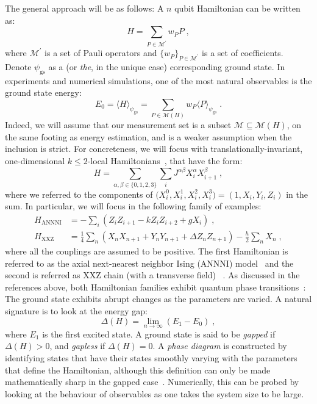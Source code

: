 \documentclass[10pt,aps,pra,twocolumn,floatfix,nofootinbib,superscriptaddress,longbibliography]{revtex4-2}
\newcommand{\1}{\mathbbm{1}}
\begin{document}
The general  approach will be as follows: A $n$ qubit Hamiltonian can be written as:
\begin{equation}
    H = \sum_{P \in \mathcal M^\prime}w_P P\;,
\end{equation}
where $\mathcal M^\prime$ is a set of Pauli operators and $\{w_P\}_{P \in \mathcal M^\prime}$ is a set of coefficients. Denote $\psi_\mathrm{gs}$ as a (or \emph{the}, in the unique case) corresponding ground state. In experiments and numerical simulations, one of the most natural observables is the ground state energy:
\begin{equation}
    E_0 = \langle H  \rangle_{\psi_\mathrm{gs}} = \sum_{P \in \mathcal M(H)} w_P \langle P \rangle_{\psi_\mathrm{gs}}\;.
\end{equation}
Indeed, we will assume that our measurement set is a subset $\mathcal M \subseteq \mathcal M(H)$, on the same footing as energy estimation, and is a weaker assumption when the inclusion is strict. For concreteness, we will focus with translationally-invariant, one-dimensional $k \leq 2$-local Hamiltonians~\cite{zeng2019quantum}, that have the form:
\begin{equation}
    H =\sum_{\alpha,\beta \in \{0,1,2,3\}}\sum_i J^{\alpha \beta} X^\alpha_i X^\beta_{i+1}\;,
\end{equation}
where we referred to the components of $\mathbf (X^0_i, X^1_i, X^2_i, X^3_i) =(1, X_i, Y_i, Z_i)$ in the sum. In particular, we will focus in the following family of examples:
\begin{align}
    H_\mathrm{ANNNI} &= -\sum_{i}(  Z_i Z_{i+1}- k Z_{i}Z_{i+2} + g X_i)\;,\label{eq:ANNNI}\\
    H_\mathrm{XXZ} &= \frac{1}{4} \sum_{n} \left( X_n X_{n+1} + Y_n Y_{n+1} + \Delta Z_n Z_{n+1} \right) - \frac{h}{2} \sum_{n} X_n\;,\label{eq:XXZ}
\end{align}
where all the couplings are assumed to be positive. The first Hamiltonian is referred to as the axial next-nearest neighbor Ising (ANNNI) model~\cite{selke1988annni} and the second is referred as XXZ chain (with a transverse field) ~\cite{dmitriev2002gap}. As discussed in the references above, both Hamiltonian families exhibit quantum phase transitions~\cite{sachdev2011quantum}: The ground state exhibits abrupt changes as the parameters are varied. A natural signature is to look at the energy gap:
\begin{equation}
    \Delta(H)  =\lim_{n\to \infty}(E_1-E_0)\;,
\end{equation}
where $E_1$ is the first excited state. A ground state is said to be \emph{gapped} if $\Delta(H) >0$, and \emph{gapless} if $\Delta(H) = 0$. A \emph{phase diagram} is constructed by identifying states that have their states smoothly varying with the parameters that define the Hamiltonian, although this definition can only be made mathematically sharp in the gapped case~\cite{zeng2019quantum}. Numerically, this can be probed by looking at the behaviour of observables as one takes the system size to be large.
\end{document}
